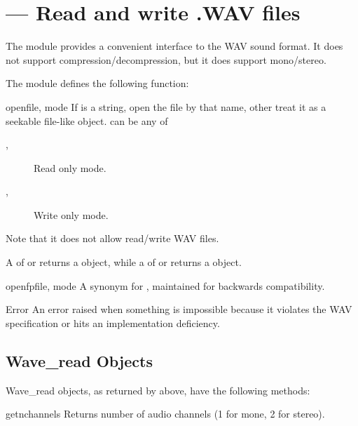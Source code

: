 \section{ ---
         Read and write .WAV files}


The  module provides a convenient interface to the WAV sound
format. It does not support compression/decompression, but it does support
mono/stereo.

The  module defines the following function:

\begin{funcdesc}{open}{file, mode}
If  is a string, open the file by that name, other treat it
as a seekable file-like object.  can be any of
\begin{description}
        \item[, ] Read only mode.
        \item[, ] Write only mode.
\end{description}
Note that it does not allow read/write WAV files.

A  of  or  returns a 
object, while a  of  or  returns
a  object.
\end{funcdesc}

\begin{funcdesc}{openfp}{file, mode}
A synonym for , maintained for backwards compatibility.
\end{funcdesc}

\begin{excdesc}{Error}
An error raised when something is impossible because it violates the
WAV specification or hits an implementation deficiency.
\end{excdesc}


\subsection{Wave_read Objects \label{Wave-read-objects}}

Wave_read objects, as returned by  above, have the
following methods:

\begin{methoddesc}{getnchannels}{}
Returns number of audio channels (1 for mone, 2 for stereo).
\end{methoddesc}

